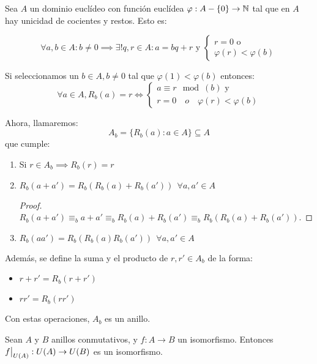 \begin{nprop}
  Sea $A$ un dominio euclídeo con función euclídea $\varphi :A-\{0\} \to \mathbb{N}$ tal que en $A$ hay unicidad de cocientes y restos. Esto es:

  $$\forall a,b \in A: b\ne 0 \implies \exists ! q,r\in A : a=bq+r \text{ y } \begin{cases}
	r = 0 \text{ o} \\
	\varphi(r) < \varphi(b)
  \end{cases}$$

  Si seleccionamos un $b \in A, b \ne 0$ tal que $\varphi(1) < \varphi(b)$ entonces:\\

  $$\forall a \in A, R_b(a) = r \iff \begin{cases}
	a \equiv r \mod(b) \text{ y} \\
	r = 0 \quad o \quad \varphi(r) < \varphi(b)
  \end{cases}$$

Ahora, llamaremos: $$ A_b = \{ R_b(a): a \in A\} \subseteq A$$ que cumple:

\begin{enumerate}
	\item Si $r\in A_b \implies R_b(r) = r$
	\item $R_b(a+a') = R_b(R_b(a) + R_b(a')) \ \ \forall a,a' \in A$ \\
	\begin{proof}
	$R_b(a+a') \equiv_b a+a' \equiv_b R_b(a) +R_b(a') \equiv_b R_b(R_b(a) + R_b(a'))$.
\end{proof}
	\item $R_b(aa') = R_b(R_b(a)R_b(a')) \ \ \forall a,a' \in A$
\end{enumerate}

Además, se define la suma y el producto de $r,r' \in A_b$ de la forma:
\begin{itemize}
	\item $r+r' = R_b(r+r')$
	\item $rr' = R_b(rr')$
\end{itemize}

Con estas operaciones, $A_b$ es un anillo.
\end{nprop}

\begin{nprop}
  Sean $A$ y $B$ anillos conmutativos, y $f: A \to B$ un isomorfismo. Entonces $\restr{f}{U(A)} : U(A) \to U(B)$
  es un isomorfismo.
\end{nprop}

